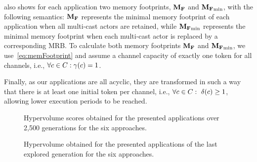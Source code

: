 also shows for each application two memory footprints, $\mathbf{M_F}$ and $\mathbf{M_F}_{{\min}}$, with the following semantics:
$\mathbf{M_F}$ represents the minimal memory footprint of each application when all multi-cast actors are retained, while $\mathbf{M_F}_{{\min}}$ represents the minimal memory footprint when each multi-cast actor is replaced by a corresponding \ac{MRB}.
To calculate both memory footprints $\mathbf{M_F}$ and $\mathbf{M_F}_{{\min}}$, we use~\cref{eq:memFootprint} and assume a channel capacity of exactly one token for all channels, i.e., $\forall c\in C: \gamma(c)=1$.
\par
Finally, as our applications are all acyclic, they are transformed in such a way that there is at least one initial token per channel, i.e., $\forall \channel\in\SetChannels:\ \Delay(\channel)\ge1$, allowing lower execution periods to be reached.
\begin{figure*}[t!]
  \resizebox{\textwidth}{!}{
    \begin{tikzpicture}
	\HypervolumeResults
    \end{tikzpicture}}
  \caption{\label{fig:hypervolume}Hypervolume scores obtained for the presented applications over 2,500 generations for the six approaches.}
\end{figure*}
\begin{figure}
\centering
\resizebox{0.8\columnwidth}{!}{
    \begin{tikzpicture}
        \HypervolumeLastIteration
    \end{tikzpicture}}
  \caption{\label{fig:hypervolumeLast}Hypervolume obtained for the presented applications of the last explored generation for the six approaches.}
\end{figure}

